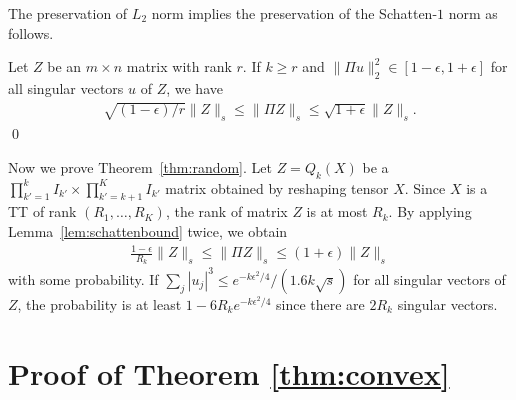 The preservation of $L_2$ norm implies the preservation of the Schatten-$1$ norm as follows.
\begin{lemma}
\label{lem:schattenbound}
Let $Z$ be an $m \times n$ matrix with rank $r$.
If $k \ge r$ and $\| \Pi u \|_2^2 \in [1-\epsilon, 1+\epsilon]$ for all singular vectors $u$ of $Z$, we have
\begin{align}
  \sqrt{(1 - \epsilon)/r} \| Z \|_s \le \| \Pi Z \|_s \le \sqrt{1 + \epsilon} \| Z \|_s.
\end{align}
\qed
\end{lemma}

Now we prove Theorem~\ref{thm:random}.
Let $Z = Q_k(X)$ be a $\prod_{k'=1}^k I_{k'} \times \prod_{k'=k+1}^K I_{k'}$ matrix obtained by reshaping tensor $X$.
Since $X$ is a TT of rank $(R_1, \ldots, R_K)$, the rank of matrix $Z$ is at most $R_k$.
By applying Lemma~\ref{lem:schattenbound} twice, we obtain
\begin{align}
  \frac{1 - \epsilon}{R_k} \| Z \|_s \le \| \Pi Z \|_s \le (1 + \epsilon) \| Z \|_s
\end{align}
with some probability. 
If $\sum_j |u_j|^3 \le e^{-k \epsilon^2/4} / (1.6 k \sqrt{s})$ for all singular vectors of $Z$, 
the probability is at least $1 - 6 R_k e^{-k \epsilon^2/4}$ since there are $2 R_k$ singular vectors.

\section{Proof of Theorem \ref{thm:convex}}

